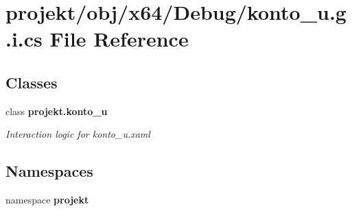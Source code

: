 \section{projekt/obj/x64/\+Debug/konto\+\_\+u.g.\+i.\+cs File Reference}
\label{x64_2Debug_2konto__u_8g_8i_8cs}
\subsection*{Classes}
\begin{DoxyCompactItemize}
\item 
class \textbf{ projekt.\+konto\+\_\+u}
\begin{DoxyCompactList}\small\item\em Interaction logic for konto\+\_\+u.\+xaml \end{DoxyCompactList}\end{DoxyCompactItemize}
\subsection*{Namespaces}
\begin{DoxyCompactItemize}
\item 
namespace \textbf{ projekt}
\end{DoxyCompactItemize}
